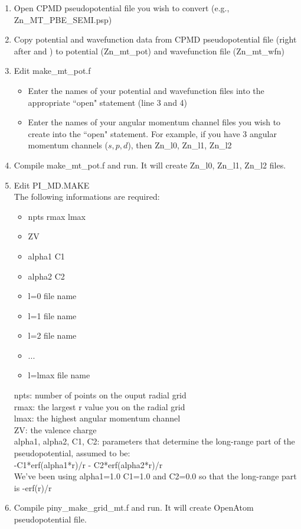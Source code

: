 \documentclass[letterpaper,12pt]{article}
\begin{document}
\begin{enumerate}
\item Open CPMD pseudopotential file you wish to convert (e.g., Zn\_MT\_PBE\_SEMI.psp)
\item  Copy potential and wavefunction data from CPMD pseudopotential file (right after {\selectfont{\&POTENTIAL}} and {\selectfont{\&WAVEFUNCTION}}) to potential (Zn{\_}mt{\_}pot) and wavefunction file (Zn\_mt\_wfn)
\item Edit make{\_}mt{\_}pot.f

        \begin{itemize}
	\item Enter the names of your potential and wavefunction files into the appropriate ``open" statement (line 3 and 4)
	\item Enter the names of your angular momentum channel files  you wish to create into the ``open" statement. 
	For example, if you have 3 angular momentum channels ($s, p, d$), then Zn{\_}l0, Zn{\_}l1, Zn{\_}l2
         \end{itemize}

\item Compile make{\_}mt{\_}pot.f and run. It will create Zn{\_}l0, Zn{\_}l1, Zn{\_}l2 files.

\item Edit PI{\_}MD.MAKE\\ The following informations are required:

	\begin{itemize}
	\item npts rmax lmax
	\item ZV
	\item alpha1 C1
	\item alpha2 C2
	\item l=0 file name 
	\item l=1 file name 
	\item l=2 file name 
	\item...
	\item l=lmax file name
	\end{itemize}
	
	npts: number of points on the ouput radial grid\\
	rmax: the largest r value you on the radial grid\\
	lmax: the highest angular momentum channel\\
	ZV: the valence charge\\
	alpha1, alpha2, C1, C2: parameters that determine the long-range part of the pseudopotential, assumed to be:\\
	
	-C1*erf(alpha1*r)/r - C2*erf(alpha2*r)/r\\
	
	We've been using alpha1=1.0 C1=1.0 and C2=0.0 so that the long-range part is -erf(r)/r

\item Compile piny{\_}make{\_}grid{\_}mt.f and run. It will create OpenAtom pseudopotential file.
\end{enumerate}
\end{document}
